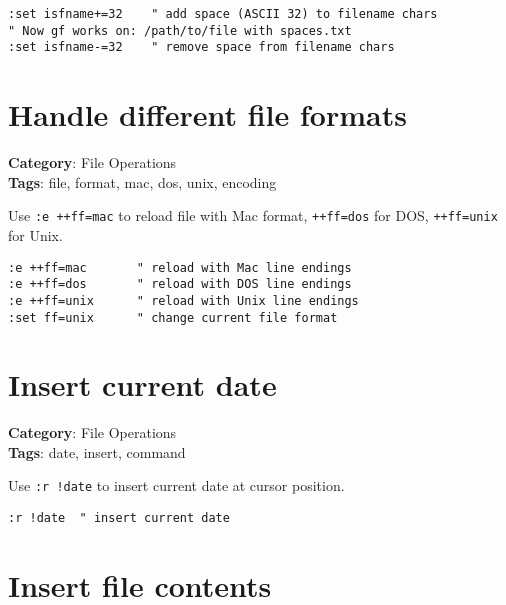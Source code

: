 {{{{{{\begin{Exa*}{}
\begin{Verbatim}[fontsize=\footnotesize, breaklines, breakanywhere]
:set isfname+=32    " add space (ASCII 32) to filename chars
" Now gf works on: /path/to/file with spaces.txt
:set isfname-=32    " remove space from filename chars
\end{Verbatim}
\end{Exa*}

\section{Handle different file formats}

\textbf{Category}: File Operations\\ \textbf{Tags}: file, format, mac, dos, unix, encoding
\vspace{0.5cm}

Use {\footnotesize \Verb§:e ++ff=mac§} to reload file with Mac format, {\footnotesize \Verb§++ff=dos§} for DOS, {\footnotesize \Verb§++ff=unix§} for Unix.

\begin{Exa*}{}
\begin{Verbatim}[fontsize=\footnotesize, breaklines, breakanywhere]
:e ++ff=mac       " reload with Mac line endings
:e ++ff=dos       " reload with DOS line endings
:e ++ff=unix      " reload with Unix line endings
:set ff=unix      " change current file format
\end{Verbatim}
\end{Exa*}

\section{Insert current date}

\textbf{Category}: File Operations\\ \textbf{Tags}: date, insert, command
\vspace{0.5cm}

Use {\footnotesize \Verb§:r !date§} to insert current date at cursor position.

\begin{Exa*}{}
\begin{Verbatim}[fontsize=\footnotesize, breaklines, breakanywhere]
:r !date  " insert current date
\end{Verbatim}
\end{Exa*}

\section{Insert file contents}

}}}}}}
